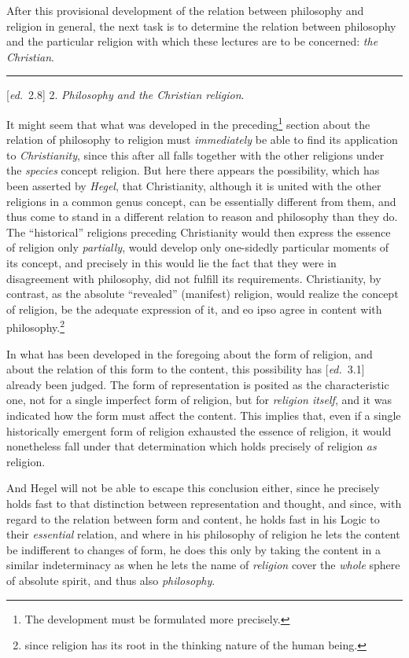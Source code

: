 \documentclass[12pt,a4paper,openany]{book}
\newcommand{\kpage}[1]{\marginnote{\footnotesize\textit{[#1]}}}
\newcommand{\ed}[1]{{\small[\textit{ed.}\ #1]}}
\newcommand{\sepline}{\par\begin{center}\rule{2cm}{0.4pt}\end{center}\par}
\begin{document}
After this provisional development of the relation between philosophy
and religion in general, the next task is to
determine the relation between philosophy and the particular religion
with which these lectures are to be concerned: \emph{the Christian}.

\sepline

\ed{2.8} 2. \emph{Philosophy and the Christian religion}.

It might seem that what was developed in the preceding\footnote[8]{The development must be formulated more precisely.} section about
the relation of philosophy to religion must \emph{immediately} be able to find
its application to \emph{Christianity}, since this after all falls together
with the other religions under the \emph{species} concept religion. But here
there appears the possibility, which has been asserted by \emph{Hegel},
that Christianity, although it is united with the other religions
in a common genus concept, can be essentially different from them, and
thus come to stand in a different relation to reason and philosophy
than they do. The ``historical'' religions preceding Christianity
would then express the essence of religion only
\emph{partially}, would develop only one-sidedly particular moments of its concept, and
precisely in this would lie the fact that they were in disagreement with philosophy,
did not fulfill its requirements. Christianity, by contrast,
as the absolute ``revealed'' (manifest) religion, would realize
the concept of religion, be the adequate expression of it, and
eo ipso agree in content with philosophy.\footnote[9]{since religion has its root in the thinking nature of the human being.}

In what has been developed in the foregoing about the form of religion,
and about the relation of this form to the content, this possibility has \ed{3.1}
\kpage{82}already been judged.
The form of representation is posited as the characteristic one,
not for a single imperfect form of religion, but for
\emph{religion itself}, and it was indicated how the form must affect
the content. This implies that, even if a single historically emergent
form of religion exhausted the essence of religion, it would nonetheless
fall under that determination which holds precisely of religion \emph{as}
religion.

And Hegel will not be able to escape this conclusion either,
since he precisely holds fast to that distinction between representation and thought,
and since, with regard to the relation between form and content,
he holds fast in his Logic to their \emph{essential} relation, and where in
his philosophy of religion he lets the content be indifferent to
changes of form, he does this only by taking the content in a similar
indeterminacy as when he lets the name of \emph{religion} cover
the \emph{whole} sphere of absolute spirit, and thus also \emph{philosophy}.
\end{document}
